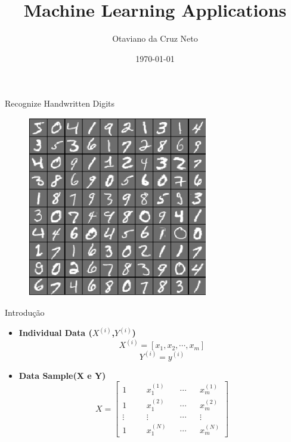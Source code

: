 \documentclass{beamer}
\title[Análise Complexidade Artigo]{Machine Learning Applications}
\author{Otaviano da Cruz Neto}
\institute{Universidade Federal Fluminense - ICEX VR}
\date{\today}
\begin{document}
\begin{frame}
  \titlepage
\end{frame}


\begin{frame}{Recognize Handwritten Digits}

\begin{figure}
	\centering
	\includegraphics[width=0.7\textwidth]{digits.png}
\end{figure}
	
	
\end{frame}

\begin{frame}{Introdução}

\begin{itemize}
	
	\item \textbf{Individual Data ($X^{(i)}$,$Y^{(i)}$)}
	\begin{equation}
	X^{(i)} = \left[  x_1, x_2, \cdots, x_m \right] 
	\end{equation}
	\begin{equation}
	Y^{(i)} = y^{(i)}  
	\end{equation}
	\item \textbf{Data Sample(X e Y)}
	\begin{equation}
	X = \left[ \begin{array}{rrccccrr}
	1 &&& x_1^{(1)} && \cdots && x_m^{(1)} \\ 
	1 &&& x_1^{(2)} && \cdots && x_m^{(2)} \\
	\vdots &&& \vdots && \cdots && \vdots \\
	1 &&& x_1^{(N)} && \cdots && x_m^{(N)} 
	
	\end{array} \right]
	\end{equation}
\end{itemize}
\end{frame}
\end{document}
